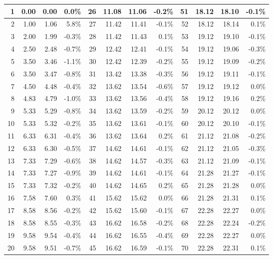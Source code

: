 \documentclass[12pt]{article}
\begin{document}
\begin{table}[h]
\begin{tabular}{|r|r|r|r|r|r|r|r|r|r|r|r|}
1 & 0.00 & 0.00 & 0.0\% & 26 & 11.08 & 11.06 & -0.2\% & 51 & 18.12 & 18.10 & -0.1\% \\ \hline
2 & 1.00 & 1.06 & 5.8\% & 27 & 11.42 & 11.41 & -0.1\% & 52 & 18.12 & 18.14 & 0.1\% \\ \hline
3 & 2.00 & 1.99 & -0.3\% & 28 & 11.42 & 11.43 & 0.1\% & 53 & 19.12 & 19.10 & -0.1\% \\ \hline
4 & 2.50 & 2.48 & -0.7\% & 29 & 12.42 & 12.41 & -0.1\% & 54 & 19.12 & 19.06 & -0.3\% \\ \hline
5 & 3.50 & 3.46 & -1.1\% & 30 & 12.42 & 12.39 & -0.2\% & 55 & 19.12 & 19.09 & -0.2\% \\ \hline
6 & 3.50 & 3.47 & -0.8\% & 31 & 13.42 & 13.38 & -0.3\% & 56 & 19.12 & 19.11 & -0.1\% \\ \hline
7 & 4.50 & 4.48 & -0.4\% & 32 & 13.62 & 13.54 & -0.6\% & 57 & 19.12 & 19.12 & 0.0\% \\ \hline
8 & 4.83 & 4.79 & -1.0\% & 33 & 13.62 & 13.56 & -0.4\% & 58 & 19.12 & 19.16 & 0.2\% \\ \hline
9 & 5.33 & 5.29 & -0.8\% & 34 & 13.62 & 13.59 & -0.2\% & 59 & 20.12 & 20.12 & 0.0\% \\ \hline
10 & 5.33 & 5.32 & -0.2\% & 35 & 13.62 & 13.61 & -0.1\% & 60 & 20.12 & 20.10 & -0.1\% \\ \hline
11 & 6.33 & 6.31 & -0.4\% & 36 & 13.62 & 13.64 & 0.2\% & 61 & 21.12 & 21.08 & -0.2\% \\ \hline
12 & 6.33 & 6.30 & -0.5\% & 37 & 14.62 & 14.61 & -0.1\% & 62 & 21.12 & 21.05 & -0.3\% \\ \hline
13 & 7.33 & 7.29 & -0.6\% & 38 & 14.62 & 14.57 & -0.3\% & 63 & 21.12 & 21.09 & -0.1\% \\ \hline
14 & 7.33 & 7.27 & -0.9\% & 39 & 14.62 & 14.61 & -0.1\% & 64 & 21.28 & 21.27 & -0.1\% \\ \hline
15 & 7.33 & 7.32 & -0.2\% & 40 & 14.62 & 14.65 & 0.2\% & 65 & 21.28 & 21.28 & 0.0\% \\ \hline
16 & 7.58 & 7.60 & 0.3\% & 41 & 15.62 & 15.62 & 0.0\% & 66 & 21.28 & 21.31 & 0.1\% \\ \hline
17 & 8.58 & 8.56 & -0.2\% & 42 & 15.62 & 15.60 & -0.1\% & 67 & 22.28 & 22.27 & 0.0\% \\ \hline
18 & 8.58 & 8.55 & -0.3\% & 43 & 16.62 & 16.58 & -0.2\% & 68 & 22.28 & 22.24 & -0.2\% \\ \hline
19 & 9.58 & 9.54 & -0.4\% & 44 & 16.62 & 16.55 & -0.4\% & 69 & 22.28 & 22.27 & 0.0\% \\ \hline
20 & 9.58 & 9.51 & -0.7\% & 45 & 16.62 & 16.59 & -0.1\% & 70 & 22.28 & 22.31 & 0.1\% \\ \hline

\end{tabular}
\end{table}
\end{document}
